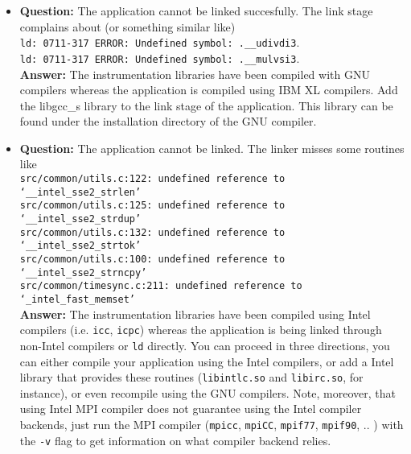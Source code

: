 \begin{itemize}
\item {\bf Question:} The application cannot be linked succesfully. The link stage complains about (or something similar like)\\
      {\tt ld: 0711-317 ERROR: Undefined symbol: .\_\_udivdi3}.\\
      {\tt ld: 0711-317 ERROR: Undefined symbol: .\_\_mulvsi3}.\\
      {\bf Answer:  } The instrumentation libraries have been compiled with GNU compilers whereas the application is compiled using IBM XL compilers. Add the libgcc\_s library to the link stage of the application. This library can be found under the installation directory of the GNU compiler.

\item {\bf Question:} The application cannot be linked. The linker misses some routines like\\
      {\tt src/common/utils.c:122: undefined reference to `\_\_intel\_sse2\_strlen'}\\
      {\tt src/common/utils.c:125: undefined reference to `\_\_intel\_sse2\_strdup'}\\
      {\tt src/common/utils.c:132: undefined reference to `\_\_intel\_sse2\_strtok'}\\
      {\tt src/common/utils.c:100: undefined reference to `\_\_intel\_sse2\_strncpy'}\\
      {\tt src/common/timesync.c:211: undefined reference to `\_intel\_fast\_memset'}\\
      {\bf Answer:  } The instrumentation libraries have been compiled using Intel compilers (i.e. {\tt icc}, {\tt icpc}) whereas the application is being linked through non-Intel compilers or {\tt ld} directly. You can proceed in three directions, you can either compile your application using the Intel compilers, or add a Intel library that provides these routines ({\tt libintlc.so} and {\tt libirc.so}, for instance), or even recompile \TRACE using the GNU compilers. Note, moreover, that using Intel MPI compiler does not guarantee using the Intel compiler backends, just run the MPI compiler ({\tt mpicc}, {\tt mpiCC}, {\tt mpif77}, {\tt mpif90}, .. ) with the {\tt -v} flag to get information on what compiler backend relies.


\end{itemize}
